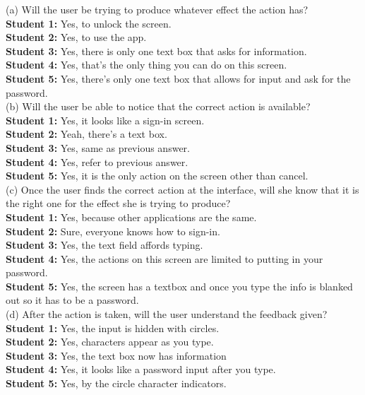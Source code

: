 \documentclass[pdftex,12pt,a4paper]{report}
\begin{document}
(a) Will the user be trying to produce whatever effect the action has?
\\\indent \textbf{Student 1:} Yes, to unlock the screen.
\\\indent \textbf{Student 2:} Yes, to use the app.
\\\indent \textbf{Student 3:} Yes, there is only one text box that asks for information.
\\\indent \textbf{Student 4:} Yes, that's the only thing you can do on this screen.
\\\indent \textbf{Student 5:} Yes, there's only one text box that allows for input and ask for the password.
\\(b) Will the user be able to notice that the correct action is available?
\\\indent \textbf{Student 1:} Yes, it looks like a sign-in screen.
\\\indent \textbf{Student 2:} Yeah, there's a text box.
\\\indent \textbf{Student 3:} Yes, same as previous answer.
\\\indent \textbf{Student 4:} Yes, refer to previous answer.
\\\indent \textbf{Student 5:} Yes, it is the only action on the screen other than cancel.
\\(c) Once the user finds the correct action at the interface, will she know that it is the right one for the effect she is trying to produce?
\\\indent \textbf{Student 1:} Yes, because other applications are the same.
\\\indent \textbf{Student 2:} Sure, everyone knows how to sign-in.
\\\indent \textbf{Student 3:} Yes, the text field affords typing.
\\\indent \textbf{Student 4:} Yes, the actions on this screen are limited to putting in your password.
\\\indent \textbf{Student 5:} Yes, the screen has a textbox and once you type the info is blanked out so it has to be a password.
\\(d) After the action is taken, will the user understand the feedback given?
\\\indent \textbf{Student 1:} Yes, the input is hidden with circles.
\\\indent \textbf{Student 2:} Yes, characters appear as you type.
\\\indent \textbf{Student 3:} Yes, the text box now has information
\\\indent \textbf{Student 4:} Yes, it looks like a password input after you type.
\\\indent \textbf{Student 5:} Yes, by the circle character indicators.
\end{document}
